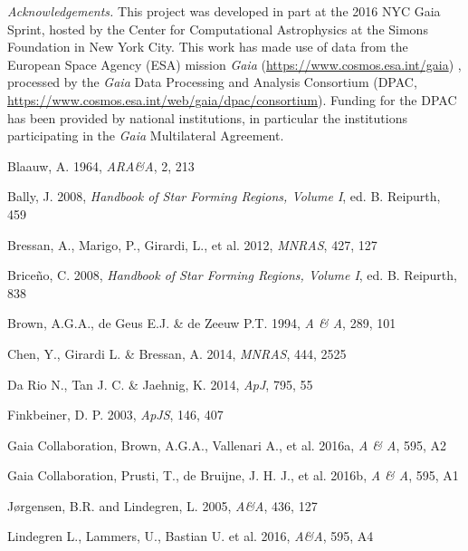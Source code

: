 \documentclass{mem}
\begin{document}
\tiny 
\textit{Acknowledgements.} This project was developed in part at the 2016 NYC Gaia Sprint, hosted by the Center for Computational Astrophysics at the Simons Foundation in New York City. This  work has made use of data from the European Space Agency (ESA)
mission {\it Gaia} (\url{https://www.cosmos.esa.int/gaia})
, processed by
the {\it Gaia} Data Processing and Analysis Consortium (DPAC,
\url{https://www.cosmos.esa.int/web/gaia/dpac/consortium}).
Funding
for the DPAC has been provided by national institutions, in particular
the institutions participating in the {\it Gaia} Multilateral Agreement.


\normalsize

\begin{thebibliography}{}

{Blaauw, A.} 1964,
\textit{ARA\&A}, 2, 213 

{Bally, J.} 2008,
\textit{Handbook of Star Forming Regions, Volume I}, ed. B. Reipurth, 459 

{Bressan, A., Marigo, P., Girardi, L., et al.} 2012,
\textit{MNRAS}, 427, 127 


{Brice\~no, C.} 2008,
\textit{Handbook of Star Forming Regions, Volume I}, ed. B. Reipurth, 838 

{Brown, A.G.A., de Geus E.J. \& de Zeeuw P.T.} 1994,
\textit{A \& A}, 289, 101 

{Chen, Y., Girardi L. \& Bressan, A.} 2014,
\textit{MNRAS}, 444, 2525 


{Da Rio N., Tan J. C. \& Jaehnig, K.} 2014,
\textit{ApJ}, 795, 55 

{Finkbeiner, D. P.} 2003,
\textit{ApJS}, 146, 407

{Gaia Collaboration, Brown, A.G.A., Vallenari A., et al.} 2016a,
\textit{A \& A}, 595, A2 

{Gaia Collaboration, Prusti, T., de Bruijne, J. H. J., et al.} 2016b,
\textit{A \& A}, 595, A1 

{J{\o}rgensen, B.R. and Lindegren, L.} 2005,
\textit{A\&A}, 436, 127 


{Lindegren L., Lammers, U., Bastian U. et al.} 2016,
\textit{A\&A}, 595, A4 



\end{thebibliography}
\end{document}
